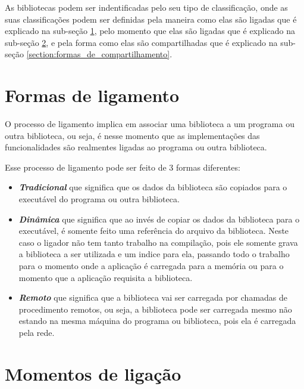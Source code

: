 As bibliotecas podem ser indentificadas pelo seu tipo de classificação, onde as suas classificações
podem ser definidas pela maneira como elas são ligadas que é explicado na sub-seção
\ref{section:formas_de_ligamento}, pelo momento que elas são ligadas que é explicado na sub-seção
\ref{section:momentos_de_ligação}, e pela forma como elas são compartilhadas que é explicado na
sub-seção \ref{section:formas_de_compartilhamento}.

\section{Formas de ligamento}
\label{section:formas_de_ligamento}

O processo de ligamento implica em associar uma biblioteca a um programa ou outra biblioteca, ou seja,
é nesse momento que as implementações das funcionalidades são realmentes ligadas ao programa ou
outra biblioteca.

Esse processo de ligamento pode ser feito de 3 formas diferentes:

\begin{itemize}

 \item \emph{\textbf{Tradicional}} que significa que os dados da biblioteca são copiados para o executável do programa
 ou outra biblioteca.

 \item \emph{\textbf{Dinâmica}} que significa que ao invés de copiar os dados da biblioteca para o executável, é
 somente feito uma referência do arquivo da biblioteca. Neste caso o ligador não tem tanto
 trabalho na compilação, pois ele somente grava a biblioteca a ser utilizada e um indice para
 ela, passando todo o trabalho para o momento onde a aplicação é carregada para a memória ou para
 o momento que a aplicação requisita a biblioteca.

 \item \emph{\textbf{Remoto}} que significa que a biblioteca vai ser carregada por chamadas de procedimento remotos,
 ou seja, a biblioteca pode ser carregada mesmo não estando na mesma máquina do programa ou
 biblioteca, pois ela é carregada pela rede.

\end{itemize}

\section{Momentos de ligação}
\label{section:momentos_de_ligação}


